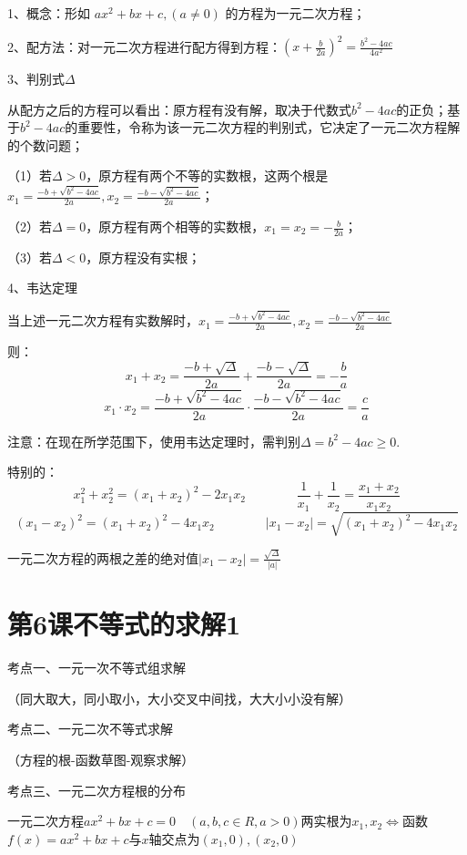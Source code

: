 \documentclass[10pt,a4paper]{ctexbook}
\begin{document}
1、概念：形如 $ax^2+bx+c,(a \ne 0)$ 的方程为一元二次方程；\par
2、配方法：对一元二次方程进行配方得到方程：$\displaystyle(x + \frac{b}{2a})^2 = \frac{b^2-4ac}{4a^2} $ \par
3、判别式$\Delta$ \par
从配方之后的方程可以看出：原方程有没有解，取决于代数式$ b^2-4ac $的正负；基于$ b^2-4ac $的重要性，令称为该一元二次方程的判别式，它决定了一元二次方程解的个数问题；\par
（1）若$\Delta > 0$，原方程有两个不等的实数根，这两个根是$\displaystyle x_1 = \frac{-b+\sqrt{b^2-4ac}}{2a} , x_2 = \frac{-b-\sqrt{b^2-4ac}}{2a}$；\par
（2）若$\Delta = 0$，原方程有两个相等的实数根，$\displaystyle x_1 = x_2 = -\frac{b}{2a}$；\par
（3）若$\Delta < 0$，原方程没有实根；\par
4、韦达定理\par
当上述一元二次方程有实数解时，$\displaystyle x_1 = \frac{-b+\sqrt{b^2-4ac}}{2a} , x_2 = \frac{-b-\sqrt{b^2-4ac}}{2a}$ \par
则：$$ x_1+x_2=\frac{-b+\sqrt{\Delta}}{2a}+\frac{-b-\sqrt{\Delta}}{2a}=-\frac{b}{a}$$
$$ x_1 \cdot x_2=\frac{-b+\sqrt{b^2-4ac}}{2a} \cdot \frac{-b-\sqrt{b^2-4ac}}{2a}=  \frac{c}{a}$$

注意：在现在所学范围下，使用韦达定理时，需判别$\Delta = b^2-4ac \ge 0 $. \par
特别的：
$$x_1^2+x_2^2 = (x_1+x_2)^2-2x_1x_2 \qquad \qquad \frac{1}{x_1}+\frac{1}{x_2} = \frac{x_1+x_2}{x_1x_2}$$
$$(x_1-x_2)^2 = (x_1+x_2)^2-4x_1x_2 \qquad \qquad | x_1-x_2 | = \sqrt{(x_1+x_2)^2-4x_1x_2}$$
{一元二次方程的两根之差的绝对值$\displaystyle | x_1-x_2 | =  \frac{\sqrt{\Delta}}{|a|}$\par}


\clearpage
\section{第6课\quad 不等式的求解1}
考点一、一元一次不等式组求解\par
（同大取大，同小取小，大小交叉中间找，大大小小没有解）

考点二、一元二次不等式求解\par
（方程的根-函数草图-观察求解）

考点三、一元二次方程根的分布\par
一元二次方程$ax^2+bx+c=0\quad (a,b,c \in R,a>0)$两实根为$x_1,x_2 \Leftrightarrow$函数$f(x)=ax^2+bx+c$与$x$轴交点为$(x_1,0),(x_2,0)$
\end{document}
